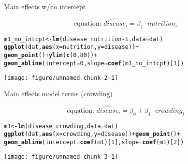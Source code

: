 \documentclass[table]{beamer}\usepackage[]{graphicx}\usepackage[]{color}
\makeatletter
\def\maxwidth{ %
  \ifdim\Gin@nat@width>\linewidth
    \linewidth
  \else
    \Gin@nat@width
  \fi
}
\newcommand{\hlnum}[1]{\textcolor[rgb]{0.686,0.059,0.569}{#1}}%
\newcommand{\hlopt}[1]{\textcolor[rgb]{0,0,0}{#1}}%
\newcommand{\hlstd}[1]{\textcolor[rgb]{0.345,0.345,0.345}{#1}}%
\newcommand{\hlkwb}[1]{\textcolor[rgb]{0.69,0.353,0.396}{#1}}%
\newcommand{\hlkwc}[1]{\textcolor[rgb]{0.333,0.667,0.333}{#1}}%
\newcommand{\hlkwd}[1]{\textcolor[rgb]{0.737,0.353,0.396}{\textbf{#1}}}%
\newenvironment{kframe}{%
 \def\at@end@of@kframe{}%
 \ifinner\ifhmode%
  \def\at@end@of@kframe{\end{minipage}}%
  \begin{minipage}{\columnwidth}%
 \fi\fi%
 \def\FrameCommand##1{\hskip\@totalleftmargin \hskip-\fboxsep
 \colorbox{shadecolor}{##1}\hskip-\fboxsep
     \hskip-\linewidth \hskip-\@totalleftmargin \hskip\columnwidth}%
 \MakeFramed {\advance\hsize-\width
   \@totalleftmargin\z@ \linewidth\hsize
   \@setminipage}}%
 {\par\unskip\endMakeFramed%
 \at@end@of@kframe}
\newenvironment{knitrout}{}{} %
\makeatother
\begin{document}
\begin{frame}[fragile]{Main effects w/no intercept}

$$ \mbox{equation: \ }  \widehat{disease}_i = \beta_1\cdot nutrition_i $$

\begin{knitrout}\scriptsize
{}\color{fgcolor}\begin{kframe}
\begin{alltt}
\hlstd{m1_no_intcpt} \hlkwb{<-} \hlkwd{lm}\hlstd{(disease} \hlopt{~} \hlstd{nutrition} \hlopt{-} \hlnum{1}\hlstd{,} \hlkwc{data}\hlstd{=dat)}
\hlkwd{ggplot}\hlstd{(dat,} \hlkwd{aes}\hlstd{(}\hlkwc{x}\hlstd{=nutrition,} \hlkwc{y}\hlstd{=disease))} \hlopt{+}
  \hlkwd{geom_point}\hlstd{()} \hlopt{+} \hlkwd{ylim}\hlstd{(}\hlkwd{c}\hlstd{(}\hlnum{0}\hlstd{,}\hlnum{80}\hlstd{))} \hlopt{+}
  \hlkwd{geom_abline}\hlstd{(}\hlkwc{intercept} \hlstd{=} \hlnum{0}\hlstd{,} \hlkwc{slope} \hlstd{=} \hlkwd{coef}\hlstd{(m1_no_intcpt)[}\hlnum{1}\hlstd{])}
\end{alltt}
\end{kframe}
\texttt{[image: figure/unnamed-chunk-2-1]} 

\end{knitrout}

\end{frame}


\begin{frame}[fragile]{Main effects model terms (crowding)}

$$ \mbox{equation: \ }  \widehat{disease}_i = \beta_0 + \beta_1\cdot crowding_i $$

\begin{knitrout}\scriptsize
{}\color{fgcolor}\begin{kframe}
\begin{alltt}
\hlstd{m1} \hlkwb{<-} \hlkwd{lm}\hlstd{(disease} \hlopt{~} \hlstd{crowding,} \hlkwc{data}\hlstd{=dat)}
\hlkwd{ggplot}\hlstd{(dat,} \hlkwd{aes}\hlstd{(}\hlkwc{x}\hlstd{=crowding,} \hlkwc{y}\hlstd{=disease))} \hlopt{+} \hlkwd{geom_point}\hlstd{()} \hlopt{+}
  \hlkwd{geom_abline}\hlstd{(}\hlkwc{intercept} \hlstd{=} \hlkwd{coef}\hlstd{(m1)[}\hlnum{1}\hlstd{],} \hlkwc{slope} \hlstd{=} \hlkwd{coef}\hlstd{(m1)[}\hlnum{2}\hlstd{])}
\end{alltt}
\end{kframe}
\texttt{[image: figure/unnamed-chunk-3-1]} 

\end{knitrout}

\end{frame}
\end{document}
